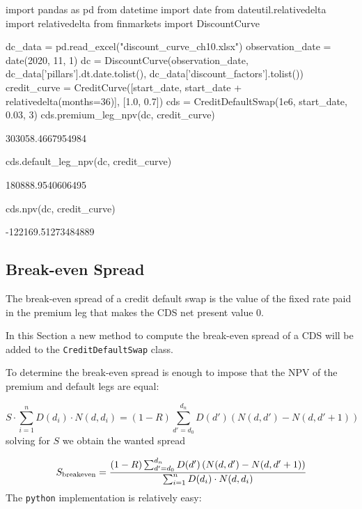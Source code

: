 \begin{ipython}
import pandas as pd
from datetime import date
from dateutil.relativedelta import relativedelta
from finmarkets import DiscountCurve

dc_data = pd.read_excel("discount_curve_ch10.xlsx")
observation_date = date(2020, 11, 1)
dc = DiscountCurve(observation_date,
dc_data['pillars'].dt.date.tolist(),
dc_data['discount_factors'].tolist())
credit_curve = CreditCurve([start_date,
                            start_date + relativedelta(months=36)],
                            [1.0, 0.7])
cds = CreditDefaultSwap(1e6, start_date, 0.03, 3)
cds.premium_leg_npv(dc, credit_curve)
\end{ipython}
\begin{ioutput}
303058.4667954984
\end{ioutput}

\begin{ipython}
cds.default_leg_npv(dc, credit_curve)
\end{ipython}
\begin{ioutput}
180888.9540606495
\end{ioutput}

\begin{ipython}
cds.npv(dc, credit_curve)
\end{ipython}
\begin{ioutput}
-122169.51273484889
\end{ioutput}
	
\subsection{Break-even Spread}
The break-even spread of a credit default swap is the value of the fixed rate paid in the premium leg that makes the CDS net present value 0.

In this Section a new method to compute the break-even spread of a CDS will be added to the \texttt{CreditDefaultSwap} class.

To determine the break-even spread is enough to impose that the NPV of the premium and default legs are equal:

\begin{equation}
S \cdot\sum_{i=1}^{n} D(d_i) \cdot N(d, d_i)
= (1-R) \sum_{d'=d_0}^{d_n} D(d') \left( N(d, d') - N(d, d'+1) \right)
\end{equation}
solving for $S$ we obtain the wanted spread

\begin{equation}
S_{\mathrm{breakeven}} = \cfrac{(1-R) \sum_{d'=d_0}^{d_n} D(d') \left( N(d, d') - N(d, d'+1) \right)}{\sum_{i=1}^{n} D(d_i) \cdot N(d, d_i)}
\end{equation}
The \texttt{python} implementation is relatively easy:

